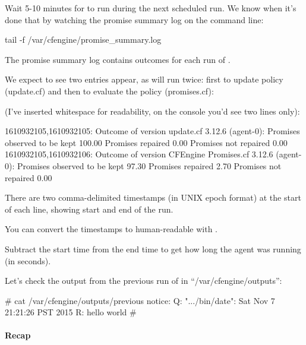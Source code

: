Wait 5-10 minutes for  to run  during the next scheduled run.
We know when it's done that by watching the promise summary log on the command line:

\begin{code}
tail -f /var/cfengine/promise_summary.log
\end{code}

The promise summary log contains outcomes for each run of .





We expect to see two entries appear, as
 will run  twice: first to update policy (update.cf)
and then to evaluate the policy (promises.cf):

(I've inserted whitespace for readability, on the console you'd see two
lines only):

\begin{code}
1610932105,1610932105: Outcome of version update.cf 3.12.6 (agent-0):
  Promises observed to be kept 100.00%
  Promises repaired 0.00%
  Promises not repaired 0.00%
1610932105,1610932106: Outcome of version CFEngine Promises.cf 3.12.6 (agent-0):
  Promises observed to be kept 97.30%
  Promises repaired 2.70%
  Promises not repaired 0.00%
\end{code}

There are two comma-delimited timestamps (in UNIX epoch format) at the start of each line,
showing start and end of the  run.

You can convert the timestamps to human-readable with .

Subtract the start time from the end time to get how long the agent was running (in seconds).





Let's check the output from the previous run of 
in ``/var/cfengine/outputs'':

\begin{code}
# cat /var/cfengine/outputs/previous
  notice: Q: ".../bin/date": Sat Nov  7 21:21:26 PST 2015
R: hello world
#
\end{code}





\paragraph{Recap}

